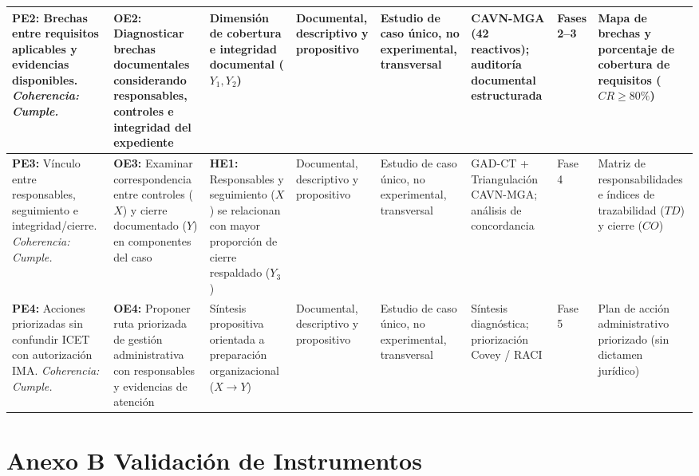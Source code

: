 {\begin{aulatexlandscape}
\begin{longtable}{@{}p{2.9cm}p{2.9cm}p{2.5cm}p{2.2cm}p{2.2cm}p{2.1cm}p{1.6cm}p{2.5cm}@{}}
\midrule
\textbf{PE2:} Brechas entre requisitos aplicables y evidencias disponibles. \textit{Coherencia: Cumple.} & \textbf{OE2:} Diagnosticar brechas documentales considerando responsables, controles e integridad del expediente & Dimensión de cobertura e integridad documental ($Y_1, Y_2$) & Documental, descriptivo y propositivo & Estudio de caso único, no experimental, transversal & CAVN-MGA (42 reactivos); auditoría documental estructurada & Fases 2--3 & Mapa de brechas y porcentaje de cobertura de requisitos ($CR \ge 80\%$) \\
\midrule
\textbf{PE3:} Vínculo entre responsables, seguimiento e integridad/cierre. \textit{Coherencia: Cumple.} & \textbf{OE3:} Examinar correspondencia entre controles ($X$) y cierre documentado ($Y$) en componentes del caso & \textbf{HE1:} Responsables y seguimiento ($X$) se relacionan con mayor proporción de cierre respaldado ($Y_3$) & Documental, descriptivo y propositivo & Estudio de caso único, no experimental, transversal & GAD-CT + Triangulación CAVN-MGA; análisis de concordancia & Fase 4 & Matriz de responsabilidades e índices de trazabilidad ($TD$) y cierre ($CO$) \\
\midrule
\textbf{PE4:} Acciones priorizadas sin confundir ICET con autorización IMA. \textit{Coherencia: Cumple.} & \textbf{OE4:} Proponer ruta priorizada de gestión administrativa con responsables y evidencias de atención & Síntesis propositiva orientada a preparación organizacional ($X \rightarrow Y$) & Documental, descriptivo y propositivo & Estudio de caso único, no experimental, transversal & Síntesis diagnóstica; priorización Covey / RACI & Fase 5 & Plan de acción administrativo priorizado (sin dictamen jurídico) \\
\bottomrule
\end{longtable}
\endgroup
\end{aulatexlandscape}

\clearpage
\section*{Anexo B Validación de Instrumentos}
}
